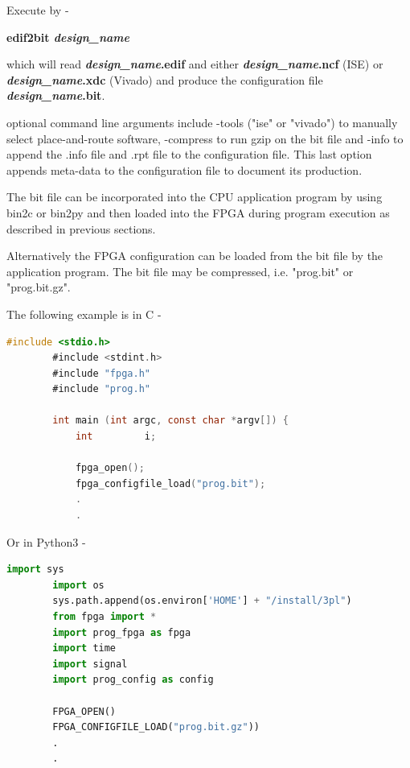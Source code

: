         Execute by -
        
        {\bf edif2bit {\em design\_name}}
        
        which will read {\bf {\em design\_name}.edif} and either
        {\bf {\em design\_name}.ncf}
        (ISE) or {\bf {\em design\_name}.xdc} (Vivado) and produce the configuration
        file {\bf {\em design\_name}.bit}.
        
        optional command line arguments include -tools ("ise" or "vivado") to
        manually select place-and-route software, -compress to run gzip on the
        bit file and -info to append the .info file and .rpt file to the
        configuration file. This last option appends meta-data to the configuration
        file to document its production.
        
        The bit file can be incorporated into the CPU application program by using
        bin2c or bin2py and then loaded into the FPGA during program execution as
        described in previous sections.
        
        Alternatively the FPGA configuration can be loaded from the bit file
        by the application program. The bit file may be compressed,
        i.e. "prog.bit" or "prog.bit.gz".
        
        The following example is in C -
        \begin{lstlisting}[gobble=4, language=C]
        #include <stdio.h>
        #include <stdint.h>
        #include "fpga.h"
        #include "prog.h"

        int main (int argc, const char *argv[]) {
            int         i;

            fpga_open();
            fpga_configfile_load("prog.bit");
            .
            .
        \end{lstlisting}
        
        Or in Python3 -
        
        \begin{lstlisting}[gobble=4, language=Python]
        import sys
        import os
        sys.path.append(os.environ['HOME'] + "/install/3pl")
        from fpga import *
        import prog_fpga as fpga
        import time
        import signal
        import prog_config as config

        FPGA_OPEN()
        FPGA_CONFIGFILE_LOAD("prog.bit.gz"))
        .
        .
        \end{lstlisting}




